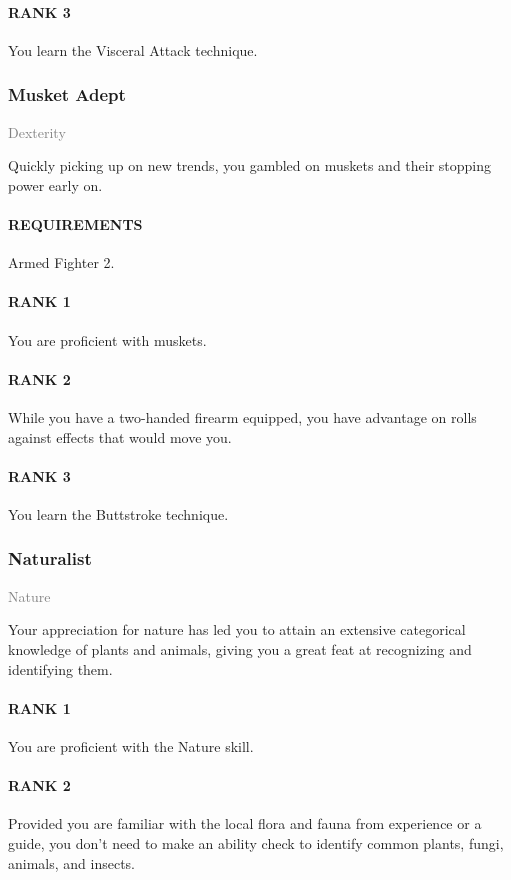 \paragraph{RANK 3} You learn the Visceral Attack technique.

\subsubsection{Musket Adept} \label{feat::musketadept}
\small{\textcolor{gray}{Dexterity}}

\normalsize
Quickly picking up on new trends, you gambled on muskets and their stopping power early on.
\paragraph{REQUIREMENTS} Armed Fighter 2.
\paragraph{RANK 1} You are proficient with muskets.
\paragraph{RANK 2} While you have a two-handed firearm equipped, you have advantage on rolls against effects that would move you.
\paragraph{RANK 3} You learn the Buttstroke technique.

\subsubsection{Naturalist} \label{feat::naturalist}
\small{\textcolor{gray}{Nature}}

\normalsize
Your appreciation for nature has led you to attain an extensive categorical knowledge of plants and animals, giving you a great feat at recognizing and identifying them.
\paragraph{RANK 1} You are proficient with the Nature skill.
\paragraph{RANK 2} Provided you are familiar with the local flora and fauna from experience or a guide, you don't need to make an ability check to identify common plants, fungi, animals, and insects.
